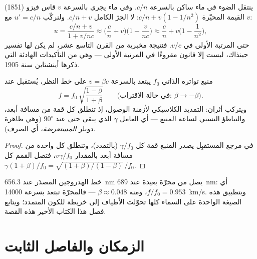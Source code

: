 \begin{example}\label{ex:b3:relativistic-kinematics:fizeau}
ينتقل الضوء في ماء ساكن بالسرعة $c/n$. وفي ماء يجري بالسرعة $v$
قاس فيزو (1851) القيمة المحيّرة $c/n + v(1 - 1/n^2)$: لا الجرّ
الكامل $c/n + v$. ولنركّب $u' = c/n$ مع $v$:
\[
u = \frac{c/n + v}{1 + v/nc}
\approx \Big(\frac{c}{n} + v\Big)\Big(1 - \frac{v}{nc}\Big)
\approx \frac{c}{n} + v\Big(1 - \frac{1}{n^2}\Big) ,
\]
حتى المرتبة الأولى في $v/c$. فنتيجة مخبرية من القرن التاسع عشر،
لم يكن لها تفسير حينذاك، ليست إلا قانون  مقروءًا
في المرتبة الأولى --- وهي من التأكيدات الهادئة التي ذكرها
أينشتاين سنة 1905.
\end{example}

\begin{proposition}\label{prop:b3:relativistic-kinematics:doppler}
منبع تواتره الذاتي $f_0$ يبتعد بالسرعة $v = \beta c$
على خط النظر، يُستقبل عند
\[
f = f_0\,\sqrt{\frac{1 - \beta}{1 + \beta}}
\qquad
\text{(في حالة الاقتراب: } \beta \to -\beta\text{)} .
\]
ويتركب أثران: التمديد الكلاسيكي لأزمنة الوصول، إذ تنطلق كل قمة
من مسافة أبعد، والتباطؤ النسبي لساعة المنبع --- أي العامل
$\gamma$ الذي يبقى حتى عند $90^\circ$ (وهي ظاهرة دوبلر
\emph{المستعرضة}، أي  الصرف).
\end{proposition}

\begin{proof}
في مرجع المستقبِل يصدر المنبع قمة كل
$\gamma/f_0$ (بالتمدد)، وتنطلق كل واحدة من مسافة أبعد بالمقدار $v\gamma/f_0$، فتصل
القمم كل $\gamma(1 + \beta)/f_0 = \sqrt{(1+\beta)/
(1-\beta)}\,/f_0$.
\end{proof}

\begin{example}\label{ex:b3:relativistic-kinematics:redshift}
خط الهدروجين المصدَر عند \qty{656.3}{nm} يصل من مجرّة بعيدة عند
\qty{689}{nm}: أي $f/f_0 = 0.953$، ومنه $\beta \approx 0.048$ ---
فالمجرّة تبتعد بسرعة \qty{14000}{km/s}. وبتطبيق هذه الصيغة الواحدة
على السماء كلها تحوّلت الأطياف إلى خريطة للكون المتمدد؛ ويتابع
فصل هذا الكتاب الأخير هذه القصة.
\end{example}

\section{الزمكان والفاصل الثابت}

